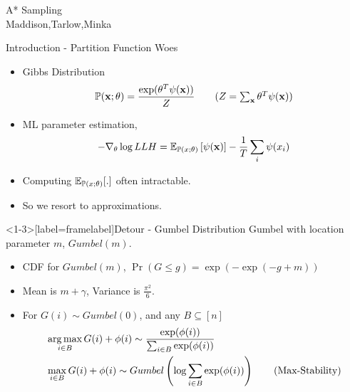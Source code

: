 \begin{frame}
  \begin{center}
    {\huge A* Sampling
    } \\
    Maddison,Tarlow,Minka
  \end{center}
\end{frame}

\begin{frame}{Introduction - Partition Function Woes}
  \begin{itemize}[<+->]
  \item Gibbs Distribution
    \begin{align*}
      \Pr(\x;\theta) =\frac{\exp(\theta^T\psi(\x))}{Z} \tag{$Z=\sum_{\x} \theta^T\psi(\x)$}
    \end{align*}
  \item ML parameter estimation,
    \begin{align*}
      - \nabla_\theta \log LLH = \operatorname{\mathbb{E}}_{\mathbb{P}(x;\theta)}\left[\psi(\operatorname{\mathbf{x}})\right] - \frac{1}{T} \sum_i\psi(x_i)
    \end{align*}
  \item Computing $\operatorname{\mathbb{E}}_{\mathbb{P}(x;\theta)}[.]$ often intractable.
  \item So we resort to approximations.
  \end{itemize}
\end{frame}

\begin{frame}<1-3>[label=framelabel]{Detour - Gumbel Distribution}
  Gumbel with location parameter $m$, $Gumbel(m)$.
  \begin{itemize}[<+->]
  \item CDF for $Gumbel(m)$, $\Pr(G\le g) = \exp(-\exp(-g+m))$
  \item Mean is $m+\gamma$, Variance is $\frac{\pi^2}{6}$.
  \item For $G(i) \sim Gumbel(0)$, and any $B \subseteq [n]$
    \begin{align*}
      & \operatorname*{{arg\,max}}_{i \in B}{G(i)+\phi(i)} \sim \frac{\exp(\phi(i))}{\sum_{i \in B} \exp(\phi(i))} \\
      & \max_{i \in B}{G(i)+\phi(i)} \sim Gumbel\left(\log \sum_{i \in B} \exp(\phi(i))\right) \tag{Max-Stability}
    \end{align*}   
  \end{itemize}
\end{frame}

